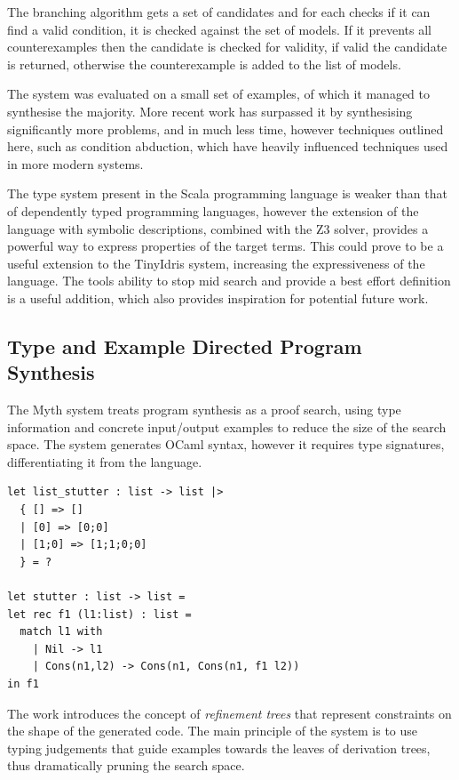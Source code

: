 \documentclass[a4paper]{article}
\begin{document}
The branching algorithm gets a set of candidates and for each checks if it can find a valid condition, it is checked 
against the set of models. If it prevents all counterexamples then the candidate is checked for validity, if valid the 
candidate is returned, otherwise the counterexample is added to the list of models. 

The system was evaluated on a small set of examples, of which it managed to synthesise the majority. More recent work 
has surpassed it by synthesising significantly more problems, and in much less time, however techniques outlined here, 
such as condition abduction, which have heavily influenced techniques used in more modern systems.

The type system present in the Scala programming language is weaker
than that of dependently typed programming languages, however the
extension of the language with symbolic descriptions, combined with the
Z3 solver, provides a powerful way to express properties of the
target terms. This could prove to be a useful extension to the
TinyIdris system, increasing the expressiveness of the language.
The tools ability to stop mid search and provide a best
effort definition is a useful addition, which also provides
inspiration for potential future work. 

\subsection{Type and Example Directed Program Synthesis}
\label{sec:org97dc857}
The Myth system\cite{10.1145/2813885.2738007} treats program synthesis as a proof search, using
type information and concrete input/output examples to reduce the size
of the search space. The system generates OCaml syntax, however it 
requires type signatures, differentiating it from the language.

\begin{center}
\begin{verbatim}
let list_stutter : list -> list |>
  { [] => []
  | [0] => [0;0]
  | [1;0] => [1;1;0;0]
  } = ?

let stutter : list -> list =
let rec f1 (l1:list) : list =
  match l1 with 
	| Nil -> l1
	| Cons(n1,l2) -> Cons(n1, Cons(n1, f1 l2))
in f1
\end{verbatim}
\end{center}

The work introduces the concept of \emph{refinement trees} that represent constraints on the shape of the generated code. 
The main principle of the system is to use typing judgements that guide examples towards the leaves of derivation trees,
thus dramatically pruning the search space.  
\end{document}
